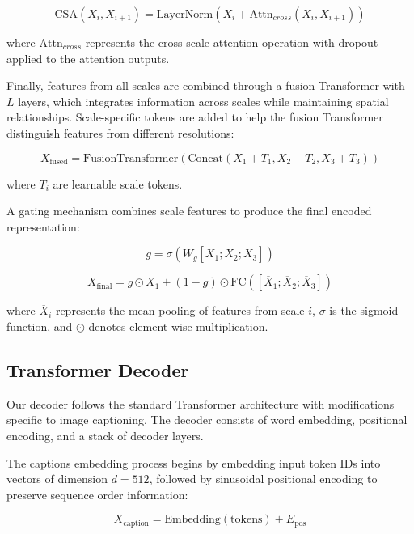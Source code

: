 \documentclass[10pt,twocolumn,letterpaper]{article}
\begin{document}
\begin{equation}
\text{CSA}(X_i, X_{i+1}) = \text{LayerNorm}(X_i + \text{Attn}_{cross}(X_i, X_{i+1}))
\end{equation}

where $\text{Attn}_{cross}$ represents the cross-scale attention operation with dropout applied to the attention outputs.

Finally, features from all scales are combined through a fusion Transformer with $L$ layers, which integrates information across scales while maintaining spatial relationships. Scale-specific tokens are added to help the fusion Transformer distinguish features from different resolutions:

\begin{equation}
X_{\text{fused}} = \text{FusionTransformer}(\text{Concat}(X_1 + T_1, X_2 + T_2, X_3 + T_3))
\end{equation}

where $T_i$ are learnable scale tokens.

A gating mechanism combines scale features to produce the final encoded representation:

\begin{equation}
g = \sigma(W_g[\overline{X}_1; \overline{X}_2; \overline{X}_3])
\end{equation}

\begin{equation}
X_{\text{final}} = g \odot X_1 + (1-g) \odot \text{FC}([\overline{X}_1; \overline{X}_2; \overline{X}_3])
\end{equation}

where $\overline{X}_i$ represents the mean pooling of features from scale $i$, $\sigma$ is the sigmoid function, and $\odot$ denotes element-wise multiplication.

\subsection{Transformer Decoder}

Our decoder follows the standard Transformer architecture with modifications specific to image captioning. The decoder consists of word embedding, positional encoding, and a stack of decoder layers.

The captions embedding process begins by embedding input token IDs into vectors of dimension $d=512$, followed by sinusoidal positional encoding to preserve sequence order information:

\begin{equation}
X_{\text{caption}} = \text{Embedding}(\text{tokens}) + E_{\text{pos}}
\end{equation}
\end{document}
